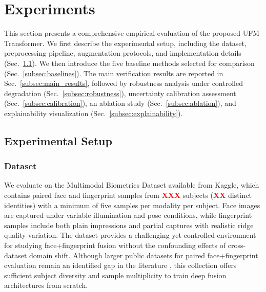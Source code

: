 \documentclass[10pt,journal,compsoc]{IEEEtran}
\begin{document}
\section{Experiments}
\label{sec:experiments}

This section presents a comprehensive empirical evaluation of the proposed UFM-Transformer. We first describe the experimental setup, including the dataset, preprocessing pipeline, augmentation protocols, and implementation details (Sec.~\ref{subsec:setup}). We then introduce the five baseline methods selected for comparison (Sec.~\ref{subsec:baselines}). The main verification results are reported in Sec.~\ref{subsec:main_results}, followed by robustness analysis under controlled degradation (Sec.~\ref{subsec:robustness}), uncertainty calibration assessment (Sec.~\ref{subsec:calibration}), an ablation study (Sec.~\ref{subsec:ablation}), and explainability visualization (Sec.~\ref{subsec:explainability}).

\subsection{Experimental Setup}
\label{subsec:setup}

\subsubsection{Dataset} We evaluate on the Multimodal Biometrics Dataset available from Kaggle, which contains paired face and fingerprint samples from \textcolor{red}{\textbf{XXX}} subjects (\textcolor{red}{\textbf{XX}} distinct identities) with a minimum of five samples per modality per subject. %
Face images are captured under variable illumination and pose conditions, while fingerprint samples include both plain impressions and partial captures with realistic ridge quality variation. The dataset provides a challenging yet controlled environment for studying face+fingerprint fusion without the confounding effects of cross-dataset domain shift. Although larger public datasets for paired face+fingerprint evaluation remain an identified gap in the literature \cite{nandakumar2008fusion, liang2024fusion}, this collection offers sufficient subject diversity and sample multiplicity to train deep fusion architectures from scratch.
\end{document}
